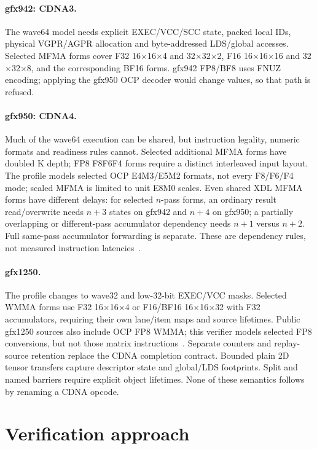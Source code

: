 \documentclass[10pt,letterpaper]{article}
\newcommand{\code}[1]{\texttt{\detokenize{#1}}}
\begin{document}
\paragraph{gfx942: CDNA3.}
The wave64 model needs explicit EXEC/VCC/SCC state, packed local IDs, physical
VGPR/AGPR allocation and byte-addressed LDS/global accesses. Selected MFMA forms
cover F32 16\(\times\)16\(\times\)4 and 32\(\times\)32\(\times\)2,
F16 16\(\times\)16\(\times\)16 and 32\(\times\)32\(\times\)8, and the
corresponding BF16 \code{_1k} forms. gfx942 FP8/BF8 uses FNUZ encoding;
applying the gfx950 OCP decoder would change values, so that path is refused.

\paragraph{gfx950: CDNA4.}
Much of the wave64 execution can be shared, but instruction legality, numeric
formats and readiness rules cannot. Selected additional MFMA forms have doubled
K depth; FP8 F8F6F4 forms require a distinct interleaved input layout. The profile
models selected OCP E4M3/E5M2 formats, not every F8/F6/F4 mode; scaled MFMA is
limited to unit E8M0 scales. Even shared XDL MFMA forms have different delays:
for selected \(n\)-pass forms, an ordinary result read/overwrite needs
\(n+3\) states on gfx942 and \(n+4\) on gfx950; a partially overlapping or
different-pass accumulator dependency needs \(n+1\) versus \(n+2\).
Full same-pass accumulator forwarding is separate. These are dependency rules,
not measured instruction latencies~\cite{llvmhazard}.

\paragraph{gfx1250.}
The profile changes to wave32 and low-32-bit EXEC/VCC masks. Selected WMMA
forms use F32 16\(\times\)16\(\times\)4 or F16/BF16
16\(\times\)16\(\times\)32 with F32 accumulators, requiring their own lane/item
maps and source lifetimes. Public gfx1250 sources also include OCP FP8 WMMA;
this verifier models selected FP8 conversions, but not those matrix
instructions~\cite{flydsl}. Separate counters and replay-source retention replace
the CDNA completion contract. Bounded plain 2D tensor transfers capture descriptor
state and global/LDS footprints. Split and named barriers require explicit
object lifetimes. None of these semantics follows by renaming a CDNA opcode.

\section{Verification approach}
\end{document}
